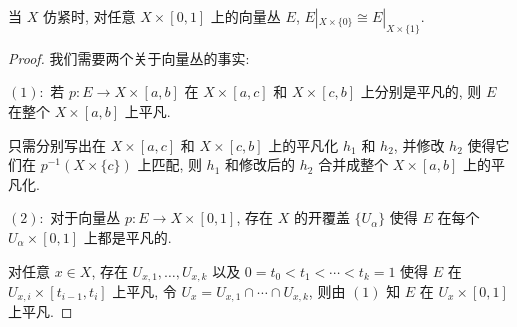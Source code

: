     \begin{proposition}[向量丛在柱空间的上下底的限制是同构的]
        当 $X$ 仿紧时, 对任意 $X\times[0,1]$ 上的向量丛 $E$, $E|_{X\times\{0\}}\cong E|_{X\times\{1\}}$.
    \end{proposition}
    \begin{proof}
        我们需要两个关于向量丛的事实:

        $(1):$ 若 $p:E\rightarrow X\times[a,b]$ 在 $X\times[a,c]$ 和 $X\times[c,b]$ 上分别是平凡的, 则 $E$ 在整个 $X\times[a,b]$ 上平凡. 
        
        只需分别写出在 $X\times[a,c]$ 和 $X\times[c,b]$ 
        上的平凡化 $h_1$ 和 $h_2$, 并修改 $h_2$ 使得它们在 $p^{-1}(X\times\{c\})$ 上匹配, 则 $h_1$ 和修改后的 $h_2$ 合并成整个 $X\times[a,b]$ 上的平凡化.

        $(2):$ 对于向量丛 $p:E\rightarrow X\times[0,1]$, 存在 $X$ 的开覆盖 $\{U_{\alpha}\}$ 使得 $E$ 在每个 $U_{\alpha}\times[0,1]$ 上都是平凡的. 
        
        对任意 $x\in X$, 存在 $U_{x,1},\dots,U_{x,k}$ 
        以及 $0=t_0<t_1<\cdots<t_k=1$ 使得 $E$ 在 $U_{x,i}\times[t_{i-1},t_i]$ 上平凡, 令 $U_x=U_{x,1}\cap\cdots\cap U_{x,k}$, 则由 $(1)$ 知 $E$ 在 $U_x\times[0,1]$ 上平凡.


\end{proof}
